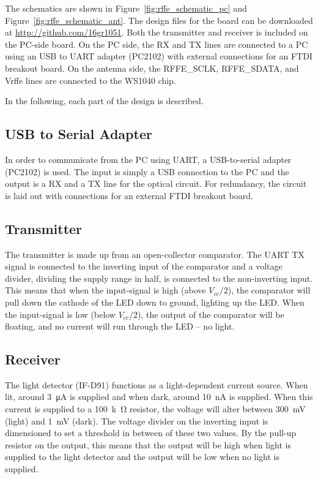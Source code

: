 The schematics are shown in Figure~\ref{fig:rffe_schematic_pc} and Figure~\ref{fig:rffe_schematic_ant}. The design files for the board can be downloaded at \url{http://github.com/16gr1051}. Both the transmitter and receiver is included on the PC-side board. On the PC side, the RX and TX lines are connected to a PC using an USB to UART adapter (PC2102) with external connections for an FTDI breakout board. On the antenna side, the RFFE\_SCLK, RFFE\_SDATA, and Vrffe lines are connected to the WS1040 chip.

In the following, each part of the design is described.

\subsection{USB to Serial Adapter}
In order to communicate from the PC using UART, a USB-to-serial adapter (PC2102) is used. The input is simply a USB connection to the PC and the output is a RX and a TX line for the optical circuit. For redundancy, the circuit is laid out with connections for an external FTDI breakout board.

\subsection{Transmitter}
The transmitter is made up from an open-collector comparator. The UART TX signal is connected to the inverting input of the comparator and a voltage divider, dividing the supply range in half, is connected to the non-inverting input. This means that when the input-signal is high (above $V_{cc}/2$), the comparator will pull down the cathode of the LED down to ground, lighting up the LED. When the input-signal is low (below $V_{cc}/2$), the output of the comparator will be floating, and no current will run through the LED -- no light.

\subsection{Receiver}
The light detector (IF-D91) functions as a light-dependent current source. When lit, around \SI{3}{\micro\ampere} is supplied and when dark, around \SI{10}{nA} is supplied. When this current is supplied to a \SI{100}{k\ohm} resistor, the voltage will alter between \SI{300}{mV} (light) and \SI{1}{mV} (dark). The voltage divider on the inverting input is dimensioned to set a threshold in between of these two values. By the pull-up resistor on the output, this means that the output will be high when light is supplied to the light detector and the output will be low when no light is supplied.

